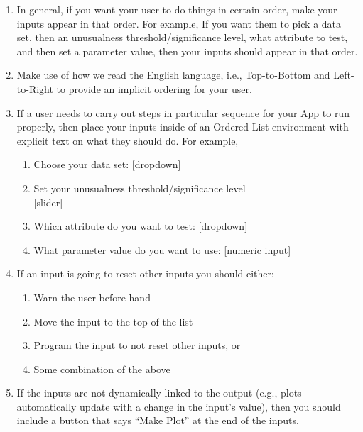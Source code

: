 \documentclass[
]{book}
\providecommand{\tightlist}{%
  \setlength{\itemsep}{0pt}\setlength{\parskip}{0pt}}
\begin{document}
\begin{enumerate}
\def\labelenumi{\arabic{enumi}.}
\tightlist
\item
  In general, if you want your user to do things in certain order, make your inputs appear in that order. For example, If you want them to pick a data set, then an unusualness threshold/significance level, what attribute to test, and then set a parameter value, then your inputs should appear in that order.
\item
  Make use of how we read the English language, i.e., Top-to-Bottom and Left-to-Right to provide an implicit ordering for your user.
\item
  If a user needs to carry out steps in particular sequence for your App to run properly, then place your inputs inside of an Ordered List environment with explicit text on what they should do. For example,

  \begin{enumerate}
  \def\labelenumii{\arabic{enumii}.}
  \tightlist
  \item
    Choose your data set: {[}dropdown{]}\\
  \item
    Set your unusualness threshold/significance level\\
    {[}slider{]}\\
  \item
    Which attribute do you want to test: {[}dropdown{]}\\
  \item
    What parameter value do you want to use: {[}numeric input{]}
  \end{enumerate}
\item
  If an input is going to reset other inputs you should either:

  \begin{enumerate}
  \def\labelenumii{\alph{enumii}.}
  \tightlist
  \item
    Warn the user before hand\\
  \item
    Move the input to the top of the list\\
  \item
    Program the input to not reset other inputs, or\\
  \item
    Some combination of the above\\
  \end{enumerate}
\item
  If the inputs are not dynamically linked to the output (e.g., plots automatically update with a change in the input's value), then you should include a button that says ``Make Plot'' at the end of the inputs.
\end{enumerate}
\end{document}

